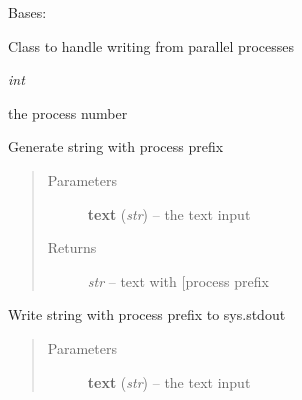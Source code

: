 \documentclass[letterpaper,10pt,english]{sphinxmanual}
\begin{document}
\begin{fulllineitems}
\label{api/ClearMap.Utils:ClearMap.Utils.ProcessWriter.ProcessWriter}
Bases: 

Class to handle writing from parallel processes

\begin{fulllineitems}
\label{api/ClearMap.Utils:ClearMap.Utils.ProcessWriter.ProcessWriter.process}
\emph{int}

the process number

\end{fulllineitems}


\begin{fulllineitems}
\label{api/ClearMap.Utils:ClearMap.Utils.ProcessWriter.ProcessWriter.writeString}
Generate string with process prefix
\begin{quote}\begin{description}
\item[{Parameters}] \leavevmode
\textbf{text} (\emph{str}) --
the text input

\item[{Returns}] \leavevmode
\emph{str} --
text with {[}process prefix

\end{description}\end{quote}

\end{fulllineitems}


\begin{fulllineitems}
\label{api/ClearMap.Utils:ClearMap.Utils.ProcessWriter.ProcessWriter.write}
Write string with process prefix to sys.stdout
\begin{quote}\begin{description}
\item[{Parameters}] \leavevmode
\textbf{text} (\emph{str}) --
the text input

\end{description}\end{quote}

\end{fulllineitems}


\end{fulllineitems}
\end{document}

